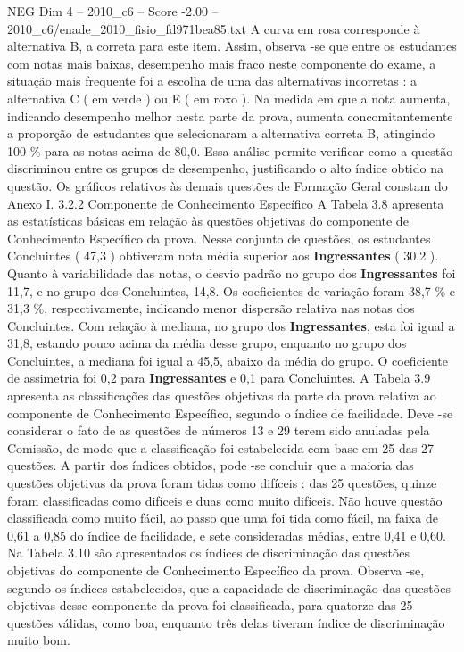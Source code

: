 \begin{textsample}{NEG Dim 4 – 2010\_c6 – Score -2.00 – 2010\_c6/enade\_2010\_fisio\_fd971bea85.txt}
A curva em rosa corresponde à alternativa B, a correta para este item.
Assim, observa -se que entre os estudantes com notas mais baixas, desempenho mais fraco neste componente do exame, a situação mais frequente foi a escolha de uma das alternativas incorretas : a alternativa C ( em verde ) ou E ( em roxo ).
Na medida em que a nota aumenta, indicando desempenho melhor nesta parte da prova, aumenta concomitantemente a proporção de estudantes que selecionaram a alternativa correta B, atingindo 100 \% para as notas acima de 80,0.
Essa análise permite verificar como a questão discriminou entre os grupos de desempenho, justificando o alto índice obtido na questão.
Os gráficos relativos às demais questões de Formação Geral constam do Anexo I. 3.2.2 Componente de Conhecimento Específico A Tabela 3.8 apresenta as estatísticas básicas em relação às questões objetivas do componente de Conhecimento Específico da prova.
Nesse conjunto de questões, os estudantes Concluintes ( 47,3 ) obtiveram nota média superior aos \textbf{Ingressantes} ( 30,2 ).
Quanto à variabilidade das notas, o desvio padrão no grupo dos \textbf{Ingressantes} foi 11,7, e no grupo dos Concluintes, 14,8.
Os coeficientes de variação foram 38,7 \% e 31,3 \%, respectivamente, indicando menor dispersão relativa nas notas dos Concluintes.
Com relação à mediana, no grupo dos \textbf{Ingressantes}, esta foi igual a 31,8, estando pouco acima da média desse grupo, enquanto no grupo dos Concluintes, a mediana foi igual a 45,5, abaixo da média do grupo.
O coeficiente de assimetria foi 0,2 para \textbf{Ingressantes} e 0,1 para Concluintes.
A Tabela 3.9 apresenta as classificações das questões objetivas da parte da prova relativa ao componente de Conhecimento Específico, segundo o índice de facilidade.
Deve -se considerar o fato de as questões de números 13 e 29 terem sido anuladas pela Comissão, de modo que a classificação foi estabelecida com base em 25 das 27 questões.
A partir dos índices obtidos, pode -se concluir que a maioria das questões objetivas da prova foram tidas como difíceis : das 25 questões, quinze foram classificadas como difíceis e duas como muito difíceis.
Não houve questão classificada como muito fácil, ao passo que uma foi tida como fácil, na faixa de 0,61 a 0,85 do índice de facilidade, e sete consideradas médias, entre 0,41 e 0,60.
Na Tabela 3.10 são apresentados os índices de discriminação das questões objetivas do componente de Conhecimento Específico da prova.
Observa -se, segundo os índices estabelecidos, que a capacidade de discriminação das questões objetivas desse componente da prova foi classificada, para quatorze das 25 questões válidas, como boa, enquanto três delas tiveram índice de discriminação muito bom.

\end{textsample}
